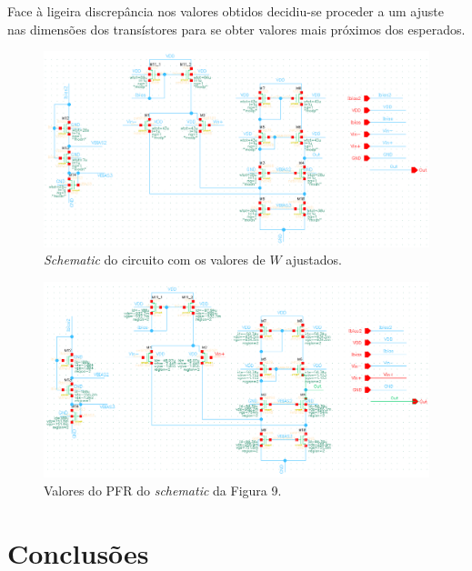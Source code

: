\documentclass[11pt]{article}
\numberwithin{equation}{section}
\begin{document}
Face à ligeira discrepância nos valores obtidos decidiu-se proceder a um ajuste nas dimensões dos transístores para se obter valores mais próximos dos esperados.


\begin{figure}[H]
	\centering
	\includegraphics[keepaspectratio=true, scale=0.70]{exps/Wajustados}
	\vspace{-0.5em}
	\caption{\textit{Schematic} do circuito com os valores de $W$ ajustados.}
	\vspace{-0.8em}
\end{figure}

\begin{figure}[H]
	\centering
		\includegraphics[keepaspectratio=true, scale=0.85]{exps/PFRajustados}
	\vspace{-0.5em}
	\caption{Valores do PFR do \textit{schematic} da Figura 9.}
	\vspace{-0.8em}
\end{figure}

\pagebreak

\section{Conclusões}
\end{document}
